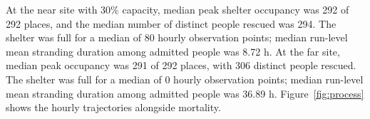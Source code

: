 At the near site with 30\% capacity, median peak shelter occupancy was 292 of 292 places, and the median number of distinct people rescued was 294. The shelter was full for a median of 80 hourly observation points; median run-level mean stranding duration among admitted people was 8.72 h. At the far site, median peak occupancy was 291 of 292 places, with 306 distinct people rescued. The shelter was full for a median of 0 hourly observation points; median run-level mean stranding duration among admitted people was 36.89 h. Figure~\ref{fig:process} shows the hourly trajectories alongside mortality.
